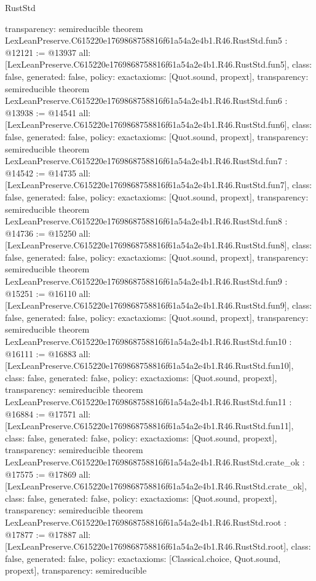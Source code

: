 \begin{lexlean}{RustStd}
\begin{coremodule}
{  transparency: semireducible
}
theorem LexLeanPreserve.C615220e1769868758816f61a54a2e4b1.R46.RustStd.fun5 : @12121 := @13937 {
  all: [LexLeanPreserve.C615220e1769868758816f61a54a2e4b1.R46.RustStd.fun5],
  class: false,
  generated: false,
  policy: exact{axioms: [Quot.sound, propext]},
  transparency: semireducible
}
theorem LexLeanPreserve.C615220e1769868758816f61a54a2e4b1.R46.RustStd.fun6 : @13938 := @14541 {
  all: [LexLeanPreserve.C615220e1769868758816f61a54a2e4b1.R46.RustStd.fun6],
  class: false,
  generated: false,
  policy: exact{axioms: [Quot.sound, propext]},
  transparency: semireducible
}
theorem LexLeanPreserve.C615220e1769868758816f61a54a2e4b1.R46.RustStd.fun7 : @14542 := @14735 {
  all: [LexLeanPreserve.C615220e1769868758816f61a54a2e4b1.R46.RustStd.fun7],
  class: false,
  generated: false,
  policy: exact{axioms: [Quot.sound, propext]},
  transparency: semireducible
}
theorem LexLeanPreserve.C615220e1769868758816f61a54a2e4b1.R46.RustStd.fun8 : @14736 := @15250 {
  all: [LexLeanPreserve.C615220e1769868758816f61a54a2e4b1.R46.RustStd.fun8],
  class: false,
  generated: false,
  policy: exact{axioms: [Quot.sound, propext]},
  transparency: semireducible
}
theorem LexLeanPreserve.C615220e1769868758816f61a54a2e4b1.R46.RustStd.fun9 : @15251 := @16110 {
  all: [LexLeanPreserve.C615220e1769868758816f61a54a2e4b1.R46.RustStd.fun9],
  class: false,
  generated: false,
  policy: exact{axioms: [Quot.sound, propext]},
  transparency: semireducible
}
theorem LexLeanPreserve.C615220e1769868758816f61a54a2e4b1.R46.RustStd.fun10 : @16111 := @16883 {
  all: [LexLeanPreserve.C615220e1769868758816f61a54a2e4b1.R46.RustStd.fun10],
  class: false,
  generated: false,
  policy: exact{axioms: [Quot.sound, propext]},
  transparency: semireducible
}
theorem LexLeanPreserve.C615220e1769868758816f61a54a2e4b1.R46.RustStd.fun11 : @16884 := @17571 {
  all: [LexLeanPreserve.C615220e1769868758816f61a54a2e4b1.R46.RustStd.fun11],
  class: false,
  generated: false,
  policy: exact{axioms: [Quot.sound, propext]},
  transparency: semireducible
}
theorem LexLeanPreserve.C615220e1769868758816f61a54a2e4b1.R46.RustStd.crate_ok : @17575 := @17869 {
  all: [LexLeanPreserve.C615220e1769868758816f61a54a2e4b1.R46.RustStd.crate_ok],
  class: false,
  generated: false,
  policy: exact{axioms: [Quot.sound, propext]},
  transparency: semireducible
}
theorem LexLeanPreserve.C615220e1769868758816f61a54a2e4b1.R46.RustStd.root : @17877 := @17887 {
  all: [LexLeanPreserve.C615220e1769868758816f61a54a2e4b1.R46.RustStd.root],
  class: false,
  generated: false,
  policy: exact{axioms: [Classical.choice, Quot.sound, propext]},
  transparency: semireducible
}


\end{coremodule}
\end{lexlean}
